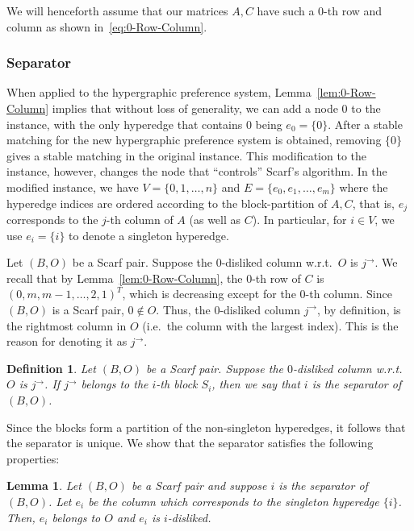 \documentclass[11pt]{article}
\newtheorem{lemma}[theorem]{Lemma}
\newtheorem{definition}[theorem]{Definition}
\begin{document}
We will henceforth assume that our matrices $A,C$ have such a $0$-th row and column as shown in~\eqref{eq:0-Row-Column}. 

\subsubsection{Separator}

When applied to the hypergraphic preference system, Lemma~\ref{lem:0-Row-Column} implies that without loss of generality, we can add a node $0$ to the instance, with the only hyperedge that contains $0$ being $e_0=\{0\}$. After a stable matching for the new hypergraphic preference system is obtained, removing $\{0\}$ gives a stable matching in the original instance. This modification to the instance, however, changes the node that ``controls'' Scarf's algorithm. In the modified instance, we have $V=\{0,1,\dots,n\}$ and $E=\{e_0,e_1,\dots,e_m\}$ where the hyperedge indices are ordered according to the block-partition of $A,C$, that is, $e_j$ corresponds to the $j$-th column of $A$ (as well as $C$). In particular, for $i\in V$, we use $e_i=\{i\}$ to denote a singleton hyperedge. 









Let $(B,O)$ be a Scarf pair. Suppose the $0$-disliked column w.r.t.~$O$ is $j^\rightarrow$. We recall that by Lemma~\ref{lem:0-Row-Column}, the $0$-th row of $C$ is $(0,m,m-1,\dots,2,1)^T$, which is decreasing except for the $0$-th column. Since $(B,O)$ is a Scarf pair, $0\notin O$. Thus, the $0$-disliked column $j^\rightarrow$, by definition, is the rightmost column in $O$ (i.e.~the column with the largest index). This is the reason for denoting it as $j^{\rightarrow}$. 



\begin{definition}\label{def:Separator}
    Let $(B,O)$ be a Scarf pair. Suppose the $0$-disliked column w.r.t.~$O$ is $j^\rightarrow$. If $j^\rightarrow$ belongs to the $i$-th block $S_i$, then we say that $i$ is the \emph{separator} of $(B,O)$.
\end{definition}

Since the blocks form a partition of the non-singleton hyperedges, it follows that the separator is unique. We show that the separator satisfies the following properties:

\begin{lemma}\label{lem:Separator-singleton}
    Let $(B,O)$ be a Scarf pair and suppose $i$ is the separator of $(B,O)$. Let $e_i$ be the column which corresponds to the singleton hyperedge $\{i\}$. Then, $e_i$ belongs to $O$ and $e_i$ is $i$-disliked.
\end{lemma}
\end{document}
